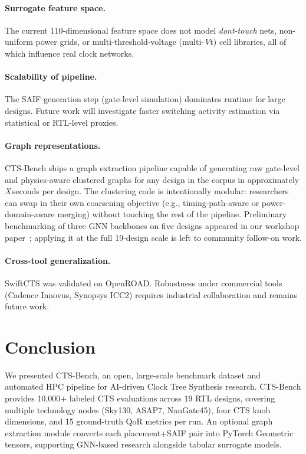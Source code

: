 \documentclass[acmsmall,review,anonymous]{acmart}
\begin{document}
\paragraph{Surrogate feature space.}
The current 110-dimensional feature space does not model \textit{dont-touch}
nets, non-uniform power grids, or multi-threshold-voltage (multi-\textit{V}t)
cell libraries, all of which influence real clock networks.

\paragraph{Scalability of pipeline.}
The SAIF generation step (gate-level simulation) dominates runtime for
large designs. Future work will investigate faster switching activity
estimation via statistical or RTL-level proxies.

\paragraph{Graph representations.}
CTS-Bench ships a graph extraction pipeline capable of generating raw
gate-level and physics-aware clustered graphs for any design in the corpus
in approximately \textit{X}\,seconds per design.
The clustering code is intentionally modular: researchers can swap in their
own coarsening objective (e.g., timing-path-aware or power-domain-aware
merging) without touching the rest of the pipeline.
Preliminary benchmarking of three GNN backbones on five designs appeared in
our workshop paper~\cite{khadka2026}; applying it at the full 19-design scale
is left to community follow-on work.

\paragraph{Cross-tool generalization.}
SwiftCTS was validated on OpenROAD. Robustness under commercial tools
(Cadence Innovus, Synopsys ICC2) requires industrial collaboration and
remains future work.

\section{Conclusion}
\label{sec:conclusion}

We presented CTS-Bench, an open, large-scale benchmark dataset and automated
HPC pipeline for AI-driven Clock Tree Synthesis research.
CTS-Bench provides 10,000+ labeled CTS evaluations across 19 RTL designs,
covering multiple technology nodes (Sky130, ASAP7, NanGate45), four CTS
knob dimensions, and 15 ground-truth QoR metrics per run.
An optional graph extraction module converts each placement+SAIF pair into
PyTorch Geometric tensors, supporting GNN-based research alongside tabular
surrogate models.
\end{document}
